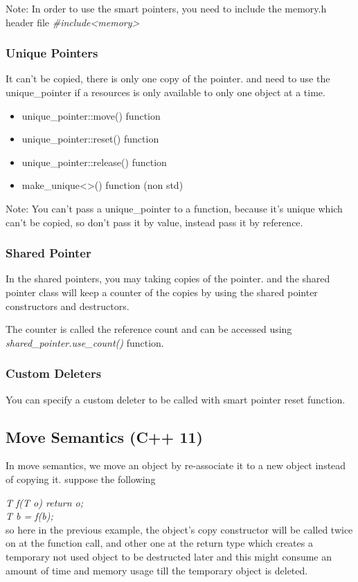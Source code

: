 \documentclass{article}
\begin{document}
Note: In order to use the smart pointers, you need to include the memory.h header file \textit{\#include<memory>}

\subsubsection{Unique Pointers}
It can't be copied, there is only one copy of the pointer. and need to use the unique\_pointer if a resources is only available to only one object at a time.




\begin{itemize}
  \item unique\_pointer::move() function
  \item unique\_pointer::reset() function
  \item unique\_pointer::release() function
  \item make\_unique<>() function (non std)
\end{itemize}

Note: You can't pass a unique\_pointer to a function, because it's unique which can't be copied, so don't pass it by value, instead pass it by reference.


\subsubsection{Shared Pointer}
In the shared pointers, you may taking copies of the pointer. and the shared pointer class will keep a counter of the copies by using the shared pointer constructors and destructors.

The counter is called the reference count and can be accessed using \textit{shared\_pointer.use\_count()} function.

\subsubsection{Custom Deleters}
You can specify a custom deleter to be called with smart pointer reset function.

\subsection{Move Semantics (C++ 11)}
In move semantics, we move an object by re-associate it to a new object instead of copying it. suppose the following

\textit{T f(T o) { return o; }\\
        T b = f(b);
}\\
so here in the previous example, the object's copy constructor will be called twice on at the function call, and other one at the return type which creates a temporary not used object to be destructed later and this might consume an amount of time and memory usage till the temporary object is deleted.
\end{document}

